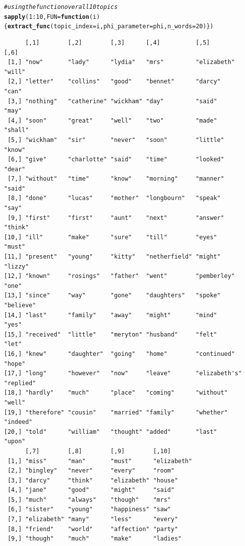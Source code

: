 \documentclass[10pt, a4paper, english]{article}\usepackage[]{graphicx}\usepackage[dvipsnames]{xcolor}
\makeatletter
\newcommand{\hlnum}[1]{\textcolor[rgb]{0.686,0.059,0.569}{#1}}%
\newcommand{\hlcom}[1]{\textcolor[rgb]{0.678,0.584,0.686}{\textit{#1}}}%
\newcommand{\hlopt}[1]{\textcolor[rgb]{0,0,0}{#1}}%
\newcommand{\hlstd}[1]{\textcolor[rgb]{0.345,0.345,0.345}{#1}}%
\newcommand{\hlkwa}[1]{\textcolor[rgb]{0.161,0.373,0.58}{\textbf{#1}}}%
\newcommand{\hlkwc}[1]{\textcolor[rgb]{0.333,0.667,0.333}{#1}}%
\newcommand{\hlkwd}[1]{\textcolor[rgb]{0.737,0.353,0.396}{\textbf{#1}}}%
\newenvironment{kframe}{%
 \def\at@end@of@kframe{}%
 \ifinner\ifhmode%
  \def\at@end@of@kframe{\end{minipage}}%
  \begin{minipage}{\columnwidth}%
 \fi\fi%
 \def\FrameCommand##1{\hskip\@totalleftmargin \hskip-\fboxsep
 \colorbox{shadecolor}{##1}\hskip-\fboxsep
     \hskip-\linewidth \hskip-\@totalleftmargin \hskip\columnwidth}%
 \MakeFramed {\advance\hsize-\width
   \@totalleftmargin\z@ \linewidth\hsize
   \@setminipage}}%
 {\par\unskip\endMakeFramed%
 \at@end@of@kframe}
\newenvironment{knitrout}{}{} %
\makeatother
\begin{document}
\begin{knitrout}
\begin{kframe}
\begin{alltt}
\hlcom{#using the function over all 10 topics}
\hlkwd{sapply}\hlstd{(}\hlnum{1}\hlopt{:}\hlnum{10}\hlstd{,} \hlkwc{FUN} \hlstd{=}\hlkwa{function}\hlstd{(}\hlkwc{i}\hlstd{)\{}\hlkwd{extract_func}\hlstd{(}\hlkwc{topic_index}\hlstd{=i,} \hlkwc{phi_parameter} \hlstd{= phi,} \hlkwc{n_words}\hlstd{=}\hlnum{20}\hlstd{)\})}
\end{alltt}
\begin{verbatim}
      [,1]        [,2]        [,3]      [,4]          [,5]          [,6]     
 [1,] "now"       "lady"      "lydia"   "mrs"         "elizabeth"   "will"   
 [2,] "letter"    "collins"   "good"    "bennet"      "darcy"       "can"    
 [3,] "nothing"   "catherine" "wickham" "day"         "said"        "may"    
 [4,] "soon"      "great"     "well"    "two"         "made"        "shall"  
 [5,] "wickham"   "sir"       "never"   "soon"        "little"      "know"   
 [6,] "give"      "charlotte" "said"    "time"        "looked"      "dear"   
 [7,] "without"   "time"      "know"    "morning"     "manner"      "said"   
 [8,] "done"      "lucas"     "mother"  "longbourn"   "speak"       "say"    
 [9,] "first"     "first"     "aunt"    "next"        "answer"      "think"  
[10,] "ill"       "make"      "sure"    "till"        "eyes"        "must"   
[11,] "present"   "young"     "kitty"   "netherfield" "might"       "lizzy"  
[12,] "known"     "rosings"   "father"  "went"        "pemberley"   "one"    
[13,] "since"     "way"       "gone"    "daughters"   "spoke"       "believe"
[14,] "last"      "family"    "away"    "might"       "mind"        "yes"    
[15,] "received"  "little"    "meryton" "husband"     "felt"        "let"    
[16,] "knew"      "daughter"  "going"   "home"        "continued"   "hope"   
[17,] "long"      "however"   "now"     "leave"       "elizabeth's" "replied"
[18,] "hardly"    "much"      "place"   "coming"      "without"     "well"   
[19,] "therefore" "cousin"    "married" "family"      "whether"     "indeed" 
[20,] "told"      "william"   "thought" "added"       "last"        "upon"   
      [,7]        [,8]        [,9]        [,10]         
 [1,] "miss"      "man"       "must"      "elizabeth"   
 [2,] "bingley"   "never"     "every"     "room"        
 [3,] "darcy"     "think"     "elizabeth" "house"       
 [4,] "jane"      "good"      "might"     "said"        
 [5,] "much"      "always"    "though"    "mrs"         
 [6,] "sister"    "young"     "happiness" "saw"         
 [7,] "elizabeth" "many"      "less"      "every"       
 [8,] "friend"    "world"     "affection" "party"       
 [9,] "though"    "much"      "make"      "ladies"      

\end{verbatim}
\end{kframe}
\end{knitrout}
\end{document}
